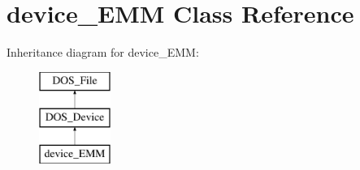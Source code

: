 \hypertarget{classdevice__EMM}{\section{device\-\_\-\-E\-M\-M Class Reference}
\label{classdevice__EMM}
}
Inheritance diagram for device\-\_\-\-E\-M\-M\-:\begin{figure}[H]
\begin{center}
\leavevmode
\includegraphics[height=3.000000cm]{classdevice__EMM}
\end{center}
\end{figure}
